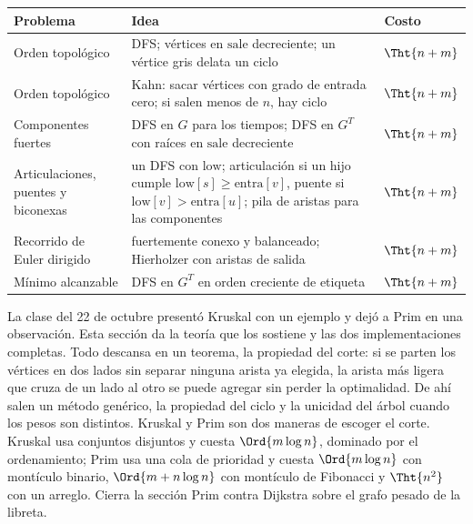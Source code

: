 \documentclass[11pt,letterpaper]{article}
\begin{document}
\begin{center}
\small
\begin{tabular}{>{\raggedright\arraybackslash}p{3.4cm}
                >{\raggedright\arraybackslash}p{8.2cm}l}
  \toprule
  \textbf{Problema} & \textbf{Idea} & \textbf{Costo} \\
  \midrule
  Orden topológico & DFS; vértices en $\text{sale}$ decreciente; un
    vértice gris delata un ciclo & $\Tht{n + m}$ \\
  \addlinespace
  Orden topológico & Kahn: sacar vértices con grado de entrada cero;
    si salen menos de $n$, hay ciclo & $\Tht{n + m}$ \\
  \addlinespace
  Componentes fuertes & DFS en $G$ para los tiempos; DFS en $G^T$ con
    raíces en $\text{sale}$ decreciente & $\Tht{n + m}$ \\
  \addlinespace
  Articulaciones, puentes y biconexas & un DFS con $\text{low}$;
    articulación si un hijo cumple $\text{low}[s] \ge
    \text{entra}[v]$, puente si $\text{low}[v] > \text{entra}[u]$;
    pila de aristas para las componentes & $\Tht{n + m}$ \\
  \addlinespace
  Recorrido de Euler dirigido & fuertemente conexo y balanceado;
    Hierholzer con aristas de salida & $\Tht{n + m}$ \\
  \addlinespace
  Mínimo alcanzable & DFS en $G^T$ en orden creciente de etiqueta
    & $\Tht{n + m}$ \\
  \bottomrule
\end{tabular}
\end{center}

\newpage


\label{sec:mst}

\begin{quick_sum}
  La clase del 22 de octubre presentó Kruskal con un ejemplo y dejó a
  Prim en una observación. Esta sección da la teoría que los sostiene
  y las dos implementaciones completas. Todo descansa en un teorema,
  la propiedad del corte: si se parten los vértices en dos lados sin
  separar ninguna arista ya elegida, la arista más ligera que cruza de
  un lado al otro se puede agregar sin perder la optimalidad. De ahí
  salen un método genérico, la propiedad del ciclo y la unicidad del
  árbol cuando los pesos son distintos. Kruskal y Prim son dos maneras
  de escoger el corte. Kruskal usa conjuntos disjuntos y cuesta
  $\Ord{m \log n}$, dominado por el ordenamiento; Prim usa una cola de
  prioridad y cuesta $\Ord{m \log n}$ con montículo binario,
  $\Ord{m + n \log n}$ con montículo de Fibonacci y $\Tht{n^2}$ con un
  arreglo. Cierra la sección Prim contra Dijkstra sobre el grafo
  pesado de la libreta.
\end{quick_sum}
\end{document}
